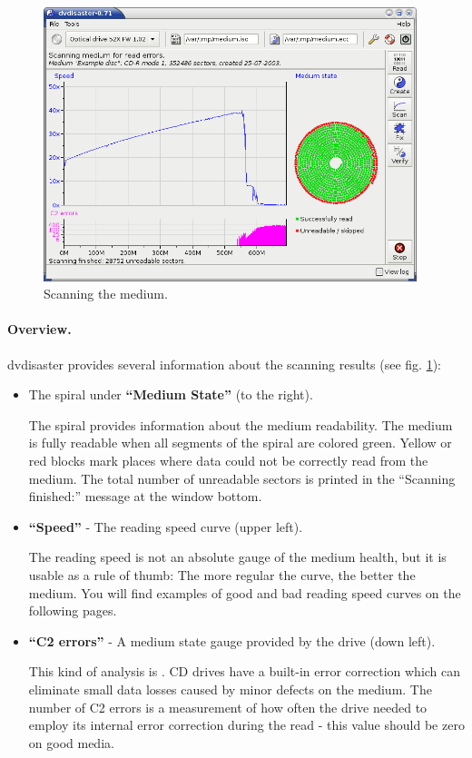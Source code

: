 \begin{figure}[h]
\centerline{\includegraphics[width=0.97\textwidth]{screenshots/defective-cd-scan.png}}
\caption{Scanning the medium.}  
\label{howto-scan-general-results}
\end{figure}

\vspace*{-5mm}

\paragraph{Overview.} dvdisaster provides several information
about the scanning results (see fig. \ref{howto-scan-general-results}): 

\begin{itemize}
  \item The spiral under {\bf ``Medium State''} (to the right).

    The spiral provides information about the medium readability.
    The medium is fully readable when all segments of the spiral
    are colored green. Yellow or red blocks mark places where data
    could not be correctly read from the medium. The total number
    of unreadable sectors is printed in the ``Scanning finished:''
    message at the window bottom.

  \item {\bf ``Speed''} - The reading speed curve (upper left).

    The reading speed is not an absolute gauge of the medium
    health, but it is usable as a rule of thumb: The more
    regular the curve, the better the medium. You will
    find examples of good and bad reading speed curves on the following pages.

  \item {\bf ``C2 errors''} - A medium state gauge provided by the drive (down left).

    This kind of analysis is .
    CD drives have a built-in error correction
    which can eliminate small data losses caused by minor
    defects on the medium. The number of C2 errors is a
    measurement of how often the drive needed to employ its
    internal error correction during the read - this value
    should be zero on good media.
\end{itemize}

